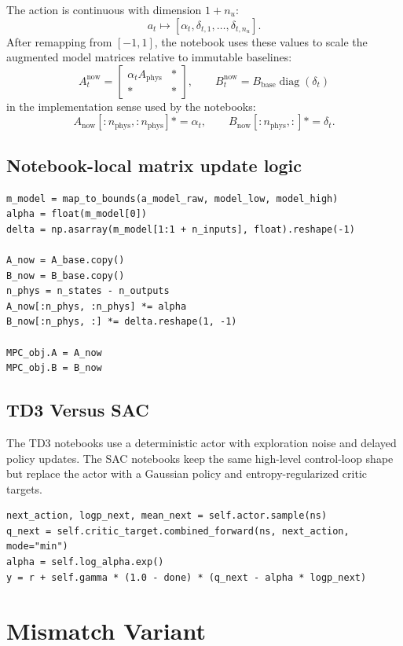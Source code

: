 \documentclass[11pt]{article}
\begin{document}
The action is continuous with dimension $1 + n_u$:
\[
a_t \mapsto [\alpha_t, \delta_{t,1}, \dots, \delta_{t,n_u}].
\]
After remapping from $[-1, 1]$, the notebook uses these values to scale the
augmented model matrices relative to immutable baselines:
\[
A_t^{\mathrm{now}} =
\begin{bmatrix}
\alpha_t A_{\mathrm{phys}} & * \\
* & *
\end{bmatrix},
\qquad
B_t^{\mathrm{now}} = B_{\mathrm{base}} \operatorname{diag}(\delta_t)
\]
in the implementation sense used by the notebooks:
\[
A_{\mathrm{now}}[:n_{\mathrm{phys}}, :n_{\mathrm{phys}}] *= \alpha_t,
\qquad
B_{\mathrm{now}}[:n_{\mathrm{phys}}, :] *= \delta_t.
\]

\subsection*{Notebook-local matrix update logic}

\begin{lstlisting}
m_model = map_to_bounds(a_model_raw, model_low, model_high)
alpha = float(m_model[0])
delta = np.asarray(m_model[1:1 + n_inputs], float).reshape(-1)

A_now = A_base.copy()
B_now = B_base.copy()
n_phys = n_states - n_outputs
A_now[:n_phys, :n_phys] *= alpha
B_now[:n_phys, :] *= delta.reshape(1, -1)

MPC_obj.A = A_now
MPC_obj.B = B_now
\end{lstlisting}

\subsection*{TD3 Versus SAC}

The TD3 notebooks use a deterministic actor with exploration noise and delayed
policy updates. The SAC notebooks keep the same high-level control-loop shape
but replace the actor with a Gaussian policy and entropy-regularized critic
targets.

\begin{lstlisting}
next_action, logp_next, mean_next = self.actor.sample(ns)
q_next = self.critic_target.combined_forward(ns, next_action, mode="min")
alpha = self.log_alpha.exp()
y = r + self.gamma * (1.0 - done) * (q_next - alpha * logp_next)
\end{lstlisting}

\section*{Mismatch Variant}
\end{document}
